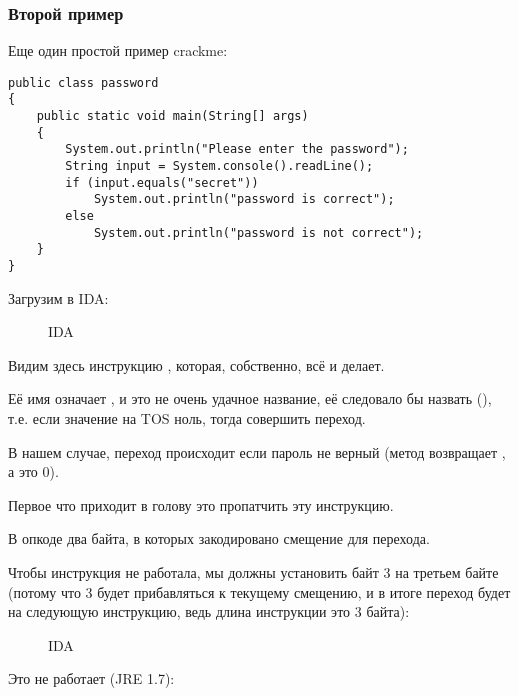 \subsubsection{Второй пример}

Еще один простой пример crackme:

\begin{lstlisting}
public class password
{
	public static void main(String[] args)
	{
		System.out.println("Please enter the password");
		String input = System.console().readLine();
		if (input.equals("secret"))
			System.out.println("password is correct");
		else
			System.out.println("password is not correct");
	}
}
\end{lstlisting}

Загрузим в IDA:

\begin{figure}[H]
\centering
{}
\caption{IDA}
\end{figure}


Видим здесь инструкцию , которая, собственно, всё и делает.

Её имя означает , и это не очень удачное название, её следовало бы назвать 
 (), т.е. если значение на \ac{TOS} ноль, тогда совершить переход.

В нашем случае, переход происходит если пароль не верный 
(метод  возвращает , а это 0).

Первое что приходит в голову это пропатчить эту инструкцию.

В опкоде  два байта, в которых закодировано смещение для перехода.

Чтобы инструкция не работала, мы должны установить байт 3 на третьем байте
(потому что 3 будет прибавляться к текущему смещению, и в итоге переход будет на следующую инструкцию,
ведь длина инструкции  это 3 байта):

\begin{figure}[H]
\centering
{}
\caption{IDA}
\end{figure}

Это не работает (JRE 1.7):

